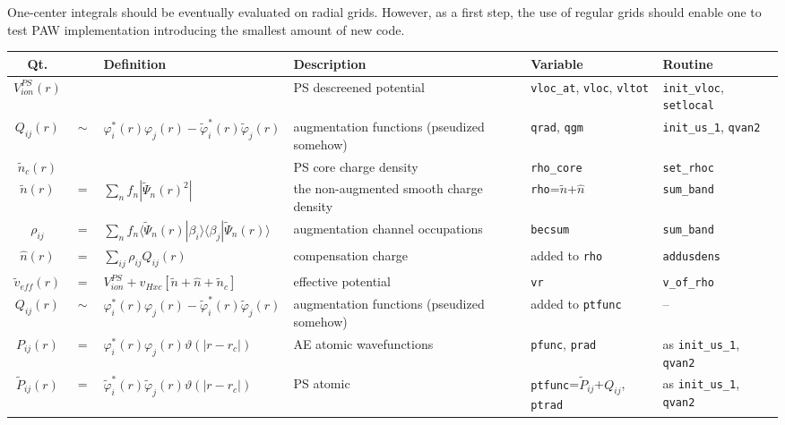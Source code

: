 \documentclass[a4paper,twocolumn,12pt]{article}
\newcommand{\var}[1]{{\tt #1}}
\renewcommand{\phi}{\varphi}
\renewcommand{\theta}{\vartheta}
\begin{document}
 One-center integrals should be
eventually evaluated on radial grids. However, as a first step, the use of
regular grids should enable one to test PAW implementation
introducing the smallest amount of new code.

\begin{table*}
\hspace{-1.2cm}
\begin{small}
\begin{tabular}{|c@{}c@{}l|p{4.5cm}|p{4.5cm}|p{4.0cm}|}
\hline
Qt. & & Definition & Description & Variable & Routine \\
\hline
%
%
\hline $V^{PS}_{ion}(r)$ &&& PS descreened potential & \var{vloc\_at}, \var{vloc}, \var{vltot} & \var{init\_vloc}, \var{setlocal} \\
%
$Q_{ij}(r)$ &$\sim$& $\phi^*_i(r)\phi_j(r)-\tilde{\phi}^*_i(r)\tilde{\phi}_j(r)$ & augmentation functions (pseudized somehow) & \var{qrad}, \var{qgm} & \var{init\_us\_1}, \var{qvan2} \\
%
$\tilde{n}_c(r)$ && & PS core charge density & \var{rho\_core} & \var{set\_rhoc}\\
%
\hline
%
$\tilde{n}(r)$ &$=$& $\sum_n f_n |\tilde{\Psi}_n(r)^2|$ &the
non-augmented smooth charge density&\var{rho}=$\tilde{n}$+$\hat{n}$&\var{sum\_band}\\
%
$\rho_{ij}$ &$=$& $\sum_n f_n
\langle\tilde{\Psi}_n(r)|\beta_i\rangle\langle\beta_j|\tilde{\Psi}_n(r)\rangle$
& augmentation channel occupations & \var{becsum} &\var{sum\_band} \\
%
$\hat{n}(r)$ &$=$& $\sum_{ij}\rho_{ij}Q_{ij}(r)$ & compensation
charge & added to \var{rho} & \var{addusdens} \\
%
$\tilde{v}_{eff}(r)$ &$=$& $V^{PS}_{ion}+v_{Hxc}[\tilde{n}+\hat{n}+\tilde{n}_c]$ & effective potential &\var{vr} & \var{v\_of\_rho} \\
%
\hline
%
\hline $Q_{ij}(r)$ &$\sim$& $\phi^*_i(r)\phi_j(r)-\tilde{\phi}^*_i(r)\tilde{\phi}_j(r)$ & augmentation functions (pseudized somehow) & added to \var{ptfunc} & --\\
%
$P_{ij}(r)$ &$=$& $\phi^*_i(r)\phi_j(r)\theta(|r-r_c|)$ & AE atomic wavefunctions & \var{pfunc}, \var{prad} & as \var{init\_us\_1}, \var{qvan2}\\
%
$\tilde{P}_{ij}(r)$ &$=$& $\tilde{\phi}^*_i(r)\tilde{\phi}_j(r)\theta(|r-r_c|)$ & PS atomic & \var{ptfunc}=$\tilde{P}_{ij}$+$Q_{ij}$, \var{ptrad} & as \var{init\_us\_1}, \var{qvan2}\\

\end{tabular}
\end{small}
\end{table*}
\end{document}
